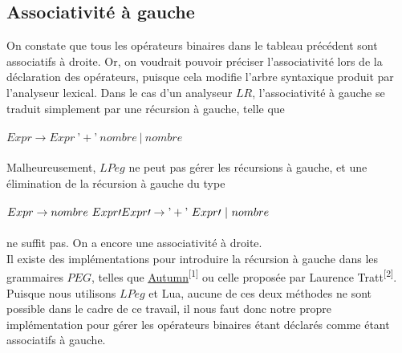 \documentclass{article}
\begin{document}
\subsection{Associativité à gauche}
On constate que tous les opérateurs binaires dans le tableau précédent sont associatifs à droite. Or, on voudrait pouvoir préciser l'associativité lors de la déclaration des opérateurs, puisque cela modifie l'arbre syntaxique produit par l'analyseur lexical. Dans le cas d'un analyseur $LR$, l'associativité à gauche se traduit simplement par une récursion à gauche, telle que
\ \\ \\
\begin{math}
Expr \rightarrow Expr \ \textrm{'}+\textrm{'} \ nombre \ | \ nombre
\end{math} \\ \\
Malheureusement, $LPeg$ ne peut pas gérer les récursions à gauche, et une élimination de la récursion à gauche du type
\\ \\
\noindent\begin{math}
	Expr \rightarrow nombre \ Expr\prime \\
	Expr\prime \rightarrow \textrm{'} + \textrm{'} \ Expr\prime \ | \ nombre
\end{math} \\ \\
ne suffit pas. On a encore une associativité à droite. \\
Il existe des implémentations pour introduire la récursion à gauche dans les grammaires $PEG$, telles que \underline{\href{https://github.com/norswap/whimsy/blob/master/doc/autumn/README.md}{Autumn}}\textsuperscript{[1]} ou celle proposée par Laurence Tratt\textsuperscript{[2]}. Puisque nous utilisons $LPeg$ et Lua, aucune de ces deux méthodes ne sont possible dans le cadre de ce travail, il nous faut donc notre propre implémentation pour gérer les opérateurs binaires étant déclarés comme étant associatifs à gauche.
\end{document}
